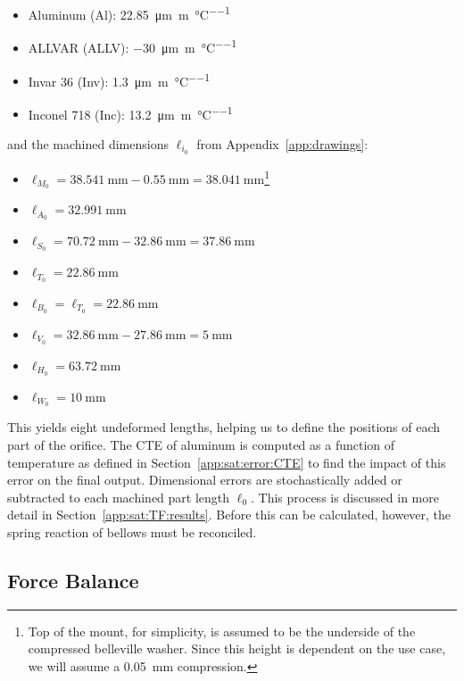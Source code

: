 \documentclass[12pt, letterpaper]{report}%
\newcounter{mycounter}           %
\newcounter{sub}[mycounter]      %
\newcommand{\specActuatorCTE}{\SI{22.85}{\micro\meter\per\meter\per\celsius}} %
\newcommand{\specMountCTE}{\SI{-30}{\micro\meter\per\meter\per\celsius}}
\newcommand{\specInvarCTE}{\SI{1.3}{\micro\meter\per\meter\per\celsius}}
\newcommand{\specInconelCTE}{\SI{13.2}{\micro\meter\per\meter\per\celsius}}
\begin{document}
\begin{appendices}
			\begin{itemize}
				\item Aluminum (Al): \specActuatorCTE\cite[Table~9-22]{ref_NASA_specs_Al}
				\item ALLVAR (ALLV): \specMountCTE\cite{ref_AllvarAlloys}
				\item Invar 36 (Inv): \specInvarCTE\cite{ref_Carpenter_Inv}
				\item Inconel 718 (Inc): \specInconelCTE\cite{ref_SpecialMetals_Inc}
			\end{itemize}

			and the machined dimensions $\ell_{i_0}$ from Appendix~\ref{app:drawings}:

			\begin{itemize}
				\item $\ell_{M_0} = \SI{38.541}{\milli\meter} - \SI{0.55}{\milli\meter} = \SI{38.041}{\milli\meter}$\footnote{Top of the mount, for simplicity, is assumed to be the underside of the compressed belleville washer. Since this height is dependent on the use case, we will assume a \SI{0.05}{\milli\meter} compression.}
				\item $\ell_{A_0} = \SI{32.991}{\milli\meter}$
				\item $\ell_{S_0} = \SI{70.72}{\milli\meter} - \SI{32.86}{\milli\meter} = \SI{37.86}{\milli\meter}$
				\item $\ell_{T_0} = \SI{22.86}{\milli\meter}$
				\item $\ell_{B_0} = \ell_{T_0} = \SI{22.86}{\milli\meter}$
				\item $\ell_{V_0} = \SI{32.86}{\milli\meter} - \SI{27.86}{\milli\meter} = \SI{5}{\milli\meter}$
				\item $\ell_{H_0} = \SI{63.72}{\milli\meter}$
				\item $\ell_{W_0} = \SI{10}{\milli\meter}$
			\end{itemize}

			This yields eight undeformed lengths, helping us to define the positions of each part of the orifice.
			The CTE of aluminum is computed as a function of temperature as defined in Section~\ref{app:sat:error:CTE} to find the impact of this error on the final output.
			Dimensional errors are stochastically added or subtracted to each machined part length $\ell_0$. This process is discussed in more detail in Section~\ref{app:sat:TF:results}. 
			Before this can be calculated, however, the spring reaction of bellows must be reconciled.

		\subsection{Force Balance}
		\label{app:sat:TF:force_balance}


\end{appendices}
\end{document}
